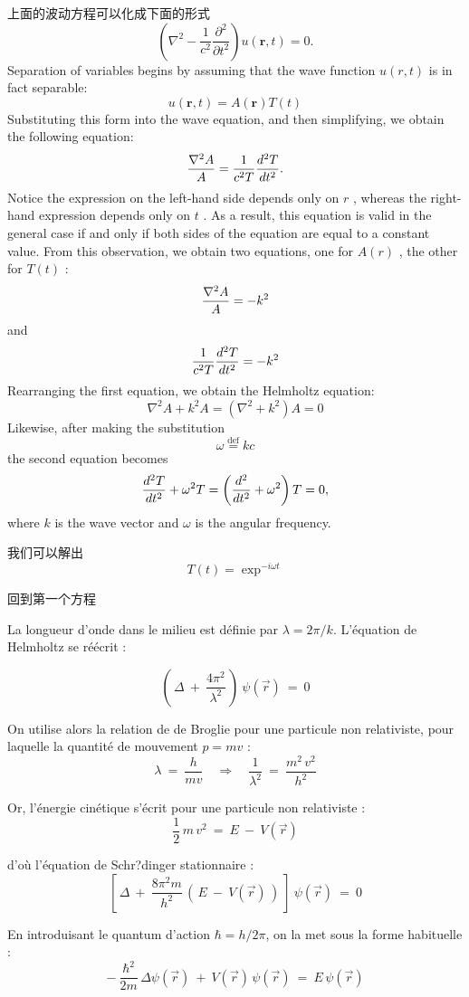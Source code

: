 \documentclass[openany]{book}
\begin{document}
上面的波动方程可以化成下面的形式
$$
\left(\nabla^2-\frac{1}{c^2}\frac{\partial^2}{\partial{t}^2}\right)u(\mathbf{r},t)=0.
$$
Separation of variables begins by assuming that the wave function $u(r, t)$ is in fact separable:
$$u(\mathbf{r},t)=A (\mathbf{r}) T(t)$$
Substituting this form into the wave equation, and then simplifying, we obtain the following equation:
$${\nabla^2 A \over A } = {1 \over c^2 T } { d^2 T \over d t^2  }.$$
Notice the expression on the left-hand side depends only on $ r$ , whereas the right-hand expression depends only on $ t$ . As a result, this equation is valid in the general case if and only if both sides of the equation are equal to a constant value. From this observation, we obtain two equations, one for $ A(r)$ , the other for $ T(t)$ :
$${\nabla^2 A \over A } = -k^2$$
and
$$ {1 \over c^2 T } { d^2 T \over dt^2  } = -k^2$$
Rearranging the first equation, we obtain the Helmholtz equation:
$$\nabla^2 A + k^2 A  =  ( \nabla^2 + k^2)  A  =  0$$
Likewise, after making the substitution
$$ \omega  \stackrel{\mathrm{def}}{=}  kc $$
the second equation becomes
$$\frac{d^2{T}}{d{t}^2} + \omega^2T  =  \left( { d^2 \over dt^2 } + \omega^2 \right) T  =  0,$$
where $k$ is the wave vector and $\omega$ is the angular frequency.\par
我们可以解出
$$
T(t) = \exp^{-i \omega t}
$$

回到第一个方程\par
La longueur d'onde dans le milieu est d\'efinie par $\lambda = 2 \pi/k$. L'\'equation de Helmholtz se r\'e\'ecrit :

$$
\left( \, \Delta \ + \ \frac{4\pi^2}{\lambda^2} \, \right) \ \psi(\vec{r}) \ = \ 0
$$

On utilise alors la relation de de Broglie pour une particule non relativiste, pour laquelle la quantit\'e de mouvement $p = m v$  :
$$
\lambda \ = \ \frac{h}{mv} \quad \Longrightarrow \quad \frac{1}{\lambda^2} \ = \ \frac{m^2 \, v^2}{h^2}
$$

Or, l'\'energie cin\'etique s'\'ecrit pour une particule non relativiste :
$$
\frac{1}{2} \, m \, v^2 \ = \ E \ - \ V(\vec{r})
$$

d'où l'\'equation de Schr?dinger stationnaire :
$$
\left[ \, \Delta \ + \ \frac{8\pi^2m}{h^2} \, \left( \, E \ - \ V(\vec{r}) \, \right) \ \right] \ \psi(\vec{r}) \ = \ 0
$$

En introduisant le quantum d'action $\hbar = h/2\pi$, on la met sous la forme habituelle :
$$
- \ \frac{\hbar^2}{2m} \, \Delta \psi(\vec{r}) \ + \ V(\vec{r}) \, \psi(\vec{r}) \ = \ E \, \psi(\vec{r})
$$
\end{document}
